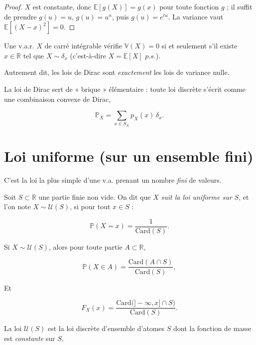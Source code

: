 \begin{proof}
$X$ est constante, donc $\mathbb{E}[g(X)]=g(x)$ pour toute fonction $g$ ; il suffit de prendre $g(u)=u$, $g(u)=u^n$, puis $g(u)=e^{tu}$. La variance vaut $\mathbb{E}[(X-x)^2]=0$.
\end{proof}

\begin{mdframed}
\begin{proposition}
Une v.a.r. $X$ de carré intégrable vérifie $\mathbb{V}(X)=0$ si et seulement s'il existe $x\in \mathbb{R}$ tel que $X\sim\delta_x$ (c'est-à-dire $X=\mathbb{E}[X]$ $p.s.$). 

Autrement dit, les lois de Dirac sont \emph{exactement} les lois de variance nulle.
\end{proposition}
\end{mdframed}

\begin{remarque}
La loi de Dirac sert de « brique » élémentaire : toute loi discrète s'écrit comme une combinaison convexe de Dirac,

$$
\mathbb{P}_X=\sum_{x\in S_X}p_X(x)\,\delta_x.
$$
\end{remarque}

\section{Loi uniforme (sur un ensemble fini)}

C'est la loi la plus simple d'une v.a. prenant un nombre \emph{fini} de valeurs.

\begin{mdframed}
\begin{definition}
Soit $S\subset \mathbb{R}$ une partie finie non vide. On dit que $X$ \emph{suit la loi uniforme sur $S$}, et l'on note $X\sim \mathcal{U}(S)$, si pour tout $x\in S$ :

$$
\mathbb{P}(X=x)=\frac{1}{\text{Card}(S)}.
$$
\end{definition}
\end{mdframed}

\medskip

\begin{mdframed}
\begin{proposition}
Si $X\sim \mathcal{U}(S)$, alors pour toute partie $A\subset \mathbb{R}$,

$$
\mathbb{P}(X\in A)=\frac{\text{Card}(A\cap S)}{\text{Card}(S)},
$$

Et

$$
  F_X(x)=\frac{\text{Card} \big(]-\infty,x]\cap S\big)}{\text{Card}(S)}.
$$

La loi $\mathcal{U}(S)$ est la loi discrète d'ensemble d'atomes $S$ dont la fonction de masse est \emph{constante} sur $S$.
\end{proposition}
\end{mdframed}

